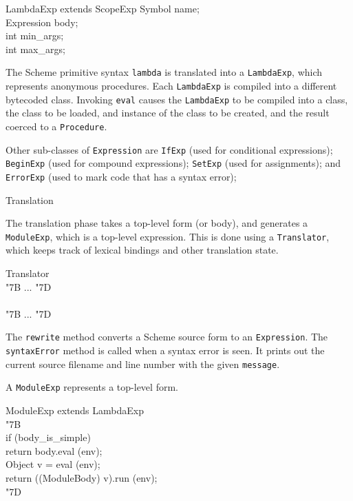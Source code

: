 \documentclass[twocolumn]{article}
\makeatletter
\def\section{\@startsection {section}{1}{\z@}
   {14pt plus 2pt minus 2pt}{12pt plus 2pt minus 2pt} {\large\bf}}
\newcommand{\LBr}{\char"7B}
\newcommand{\RBr}{\char"7D}
\newcommand{\Tab}{\>}
\makeatother
\begin{document}
\begin{Class}{LambdaExp}{ extends ScopeExp}
Symbol name; \\
Expression body;\\
int min\_args;\\
int max\_args;\\
\end{Class}

The Scheme primitive syntax {\tt lambda} is translated
into a {\tt LambdaExp}, which represents anonymous procedures.
Each {\tt LambdaExp} is compiled into a different bytecoded class.
Invoking {\tt eval} causes the {\tt LambdaExp} to be compiled
into a class, the class to be loaded, and instance of the
class to be created, and the result coerced to a {\tt Procedure}.

Other sub-classes of {\tt Expression} are
{\tt IfExp} (used for conditional expressions);
{\tt BeginExp} (used for compound expressions);
{\tt SetExp} (used for assignments);  and
{\tt ErrorExp} (used to mark code that has a syntax error);

\section{Translation}

The translation phase takes a top-level form (or body),
and generates a {\tt ModuleExp}, which is a top-level expression.
This is done using a {\tt Translator}, which keeps track of
lexical bindings and other translation state.

\begin{Class}{Translator}{}
\\
{\LBr} ... {\RBr}\\
\\
{\LBr} ... {\RBr}\\
\end{Class}

The {\tt rewrite} method converts a Scheme source form to
an {\tt Expression}.  The {\tt syntaxError} method is called when
a syntax error is seen.  It prints out the current
source filename and line number with the given {\tt message}.

A {\tt ModuleExp} represents a top-level form.

\begin{Class}{ModuleExp}{ extends LambdaExp}
\\
\LBr\+\\
  if (body\_is\_simple) \\
  \Tab return body.eval (env);\\
  Object v = eval (env);\\
  return ((ModuleBody) v).run (env);\-\\
\RBr\\
\end{Class}
\end{document}
